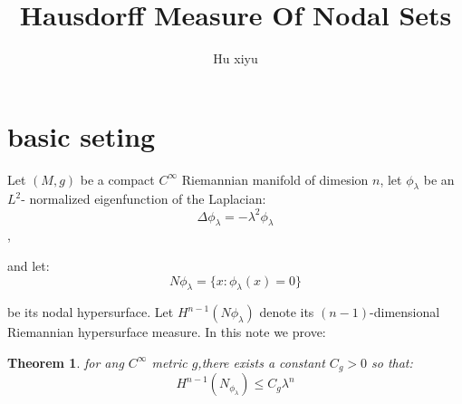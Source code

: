 \documentclass[11pt]{article}
\title{Hausdorff Measure Of Nodal Sets}
\author{Hu xiyu}
\newtheorem{theorem}{Theorem}
\begin{document}
\maketitle
\section{basic seting}
Let $(M,g)$ be a compact $C^\infty$ Riemannian manifold of dimesion $n$, let $\phi_{\lambda}$ be an $L^2$- normalized eigenfunction of the Laplacian:\\


\[\Delta \phi_{\lambda} = −\lambda^2 \phi_{\lambda}\],


and let:\\

\[N \phi_{\lambda} =\{x:\phi_{\lambda}(x)=0\}\]

be its nodal hypersurface. Let $H^{n−1}(N\phi_{\lambda} )$ denote its $(n-1)$-dimensional Riemannian hypersurface measure. In this note we prove:
\begin{theorem}

	for ang $C^\infty$ metric $g$,there exists a constant $C_g > 0$ so that:\\
	\[ H^{n-1}(N_{\phi_{\lambda}}) \leq C_g \lambda^{n}\]
\end{theorem}
\end{document}
